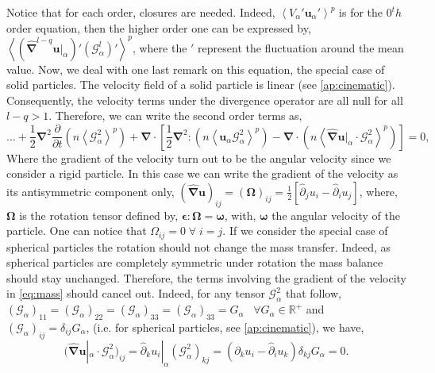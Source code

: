 Notice that for each order, closures are needed.
Indeed, $\left<V_\alpha'\bm{u}_\alpha'\right>^p$ is for the $0^th$ order equation, then the higher order one can be expressed by, 
$\left<(\hat{\bm{\nabla}}^{l-q} \bm{u}|_\alpha)' (\mathcal{G}_\alpha^l)'\right>^p$, where the $'$ represent the fluctuation around the mean value. 
Now, we deal with one last remark on this equation, the special case of solid particles. 
The velocity field of a solid particle is linear (see \ref{ap:cinematic}). 
Consequently, the velocity terms under the divergence operator are all null for all $l - q > 1$. 
Therefore, we can write the second order terms as, 
\begin{equation}
    \ldots +    
    \frac{1}{2}  \bm{\nabla}^2
    \frac{\partial }{\partial t}\left(
          n \left<\mathcal{G}_\alpha^2\right>^p
    \right) 
    + \bm{\nabla}\cdot\left[
        \frac{1}{2} \bm{\nabla}^{2} : (n \left< \bm{u}_\alpha \mathcal{G}_\alpha^2\right>^p)
        - \bm{\nabla} \cdot \left(  n \left<\hat{\bm{\nabla}} \bm{u}|_\alpha \cdot \mathcal{G}_\alpha^2\right>^p\right)
    \right]
    = 0,
    \label{eq:mass}
\end{equation}
Where the gradient of the velocity turn out to be the angular velocity since we consider a rigid particle.
In this case we can write the gradient of the velocity as its antisymmetric component only, $(\hat{\bm{\nabla}} \bm{u})_{ij} = (\bm{\Omega})_{ij} = \frac{1}{2} \left[\hat{\partial}_j u_i -\hat{\partial}_i u_j \right]$\citep{guazzelli2011},
where, $\bm{\Omega}$ is the rotation tensor defined by, $\bm{\epsilon} : \bm{\Omega} = \bm{\omega}$, with, $\bm{\omega}$ the angular velocity of the particle.
One can notice that $\Omega_{ij} = 0 \; \forall \; i = j$.  
If we consider the special case of spherical particles the rotation should not change the mass transfer.
Indeed, as spherical particles are completely symmetric under rotation the mass balance should stay unchanged. 
Therefore, the terms involving the gradient of the velocity in \ref{eq:mass} should cancel out. 
Indeed, for any tensor $\mathcal{G}_\alpha^2$ that follow, $(\mathcal{G}_\alpha)_{11} = (\mathcal{G}_\alpha)_{22} = (\mathcal{G}_\alpha)_{33} =(\mathcal{G}_\alpha)_{33} =G_\alpha \;\;\;\forall G_\alpha \in \mathbb{R}^+$ and $(\mathcal{G}_\alpha)_{ij} = \delta_{ij} G_\alpha$, (i.e. for spherical particles, see \ref{ap:cinematic}),
we have, 
\begin{equation*}
    (\hat{\bm{\nabla}} \bm{u}|_\alpha \cdot \mathcal{G}_\alpha^2)_{ij} 
    = \hat{\partial}_k u_i|_\alpha (\mathcal{G}_\alpha^2)_{kj}
    = (\hat{\partial}_k u_i -\hat{\partial}_i u_k)  \delta_{kj} G_\alpha
    = 0. 
\end{equation*}
